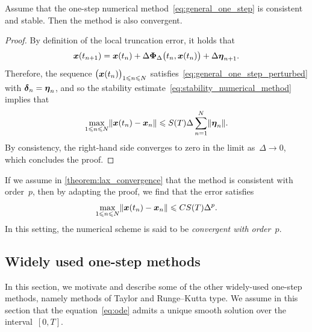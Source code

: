 \begin{theorem}
    \label{theorem:lax_convergence}
    Assume that the one-step numerical method~\eqref{eq:general_one_step} is consistent and stable.
    Then the method is also convergent.
\end{theorem}
\begin{proof}
By definition of the local truncation error, it holds that
\[
    \mathbf{\boldsymbol{x}}(t_{n+1}) = \mathbf{\boldsymbol{x}}(t_n) + \Delta \mathbf{\boldsymbol{\Phi}}_{\Delta}\bigl(t_n, \mathbf{\boldsymbol{x}}(t_n)\bigr) + \Delta \mathbf{\boldsymbol{\eta}}_{n+1}.
\]
Therefore, the sequence $\bigl(\mathbf{\boldsymbol{x}}(t_n)\bigr)_{1 \leqslant n \leqslant N}$ satisfies~\eqref{eq:general_one_step_perturbed} with $\mathbf{\boldsymbol{\delta}}_n = \mathbf{\boldsymbol{\eta}}_n$,
and so the stability estimate~\eqref{eq:stability_numerical_method} implies that
\[
    \max_{1\leqslant n \leqslant N} \lVert \mathbf{\boldsymbol{x}}(t_n) - \mathbf{\boldsymbol{x}}_n \rVert \leqslant S(T) \Delta \sum_{n=1}^{N} \lVert \mathbf{\boldsymbol{\eta}}_n \rVert.
\]
By consistency, the right-hand side converges to zero in the limit as~$\Delta \to 0$,
which concludes the proof.
\end{proof}

\begin{remark}
    If we assume in \cref{theorem:lax_convergence} that the method is consistent with order~$p$,
    then by adapting the proof,
    we find that the error satisfies
    \[
        \max_{1\leqslant n \leqslant N} \lVert \mathbf{\boldsymbol{x}}(t_n) - \mathbf{\boldsymbol{x}}_n \rVert \leqslant C S(T) \Delta^p.
    \]
    In this setting,
    the numerical scheme is said to be \emph{convergent with order~$p$}.
\end{remark}

\subsection{Widely used one-step methods}
\label{sub:other_one_step}
In this section, we motivate and describe some of the other widely-used one-step methods,
namely methods of Taylor and Runge--Kutta type.
We assume in this section that the equation~\eqref{eq:ode} admits a unique smooth solution over the interval~$[0, T]$.

